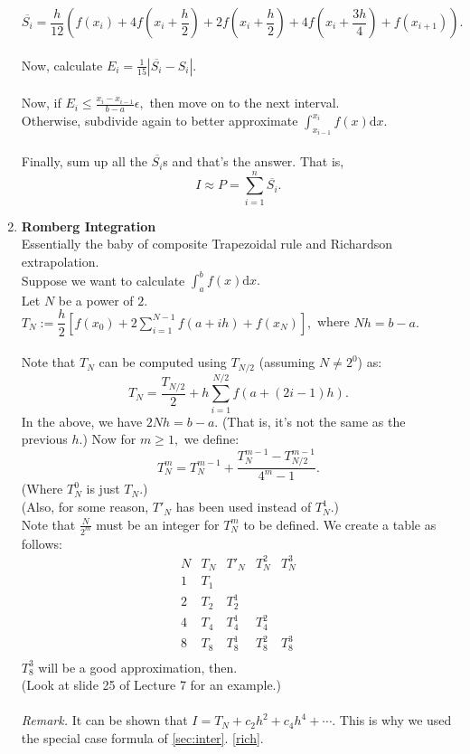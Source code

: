 \documentclass{article}
\begin{document}
\begin{enumerate}
	$\overline{S_i} = \dfrac{h}{12}\left(f(x_i) + 4f\left(x_i + \dfrac{h}{2}\right) + 2f\left(x_i + \dfrac{h}{2}\right) + 4f\left(x_i + \dfrac{3h}{4}\right) + f(x_{i+1})\right).$\\~\\
	Now, calculate $E_i = \frac{1}{15}|\overline{S_i} - S_i|.$\\~\\
	Now, if $E_i \le \frac{x_{i} - x_{i-1}}{b - a}\epsilon,$ then move on to the next interval.\\
	Otherwise, subdivide again to better approximate $\displaystyle\int_{x_{i-1}}^{x_i} f(x) \text{d}x.$\\~\\
	Finally, sum up all the $\overline{S_i}$s and that's the answer. That is,
	\[I \approx P = \sum_{i=1}^{n}\overline{S_i}.\]
	\item \textbf{Romberg Integration}\\
	Essentially the baby of composite Trapezoidal rule and Richardson extrapolation.\\
	Suppose we want to calculate $\displaystyle\int_{a}^{b} f(x) \text{d}x.$\\
	Let $N$ be a power of $2$.\\
	$T_N := \dfrac{h}{2}\left[f(x_0) + 2\displaystyle\sum_{i=1}^{N-1}f(a + ih) + f(x_N)\right],$ where $Nh = b-a.$\\~\\
	Note that $T_N$ can be computed using $T_{N/2}$ (assuming $N \neq 2^0$) as:
	\[T_N = \frac{T_{N/2}}{2} + h\sum_{i=1}^{N/2}f\left(a + (2i - 1)h\right).\]
	In the above, we have $2Nh = b - a.$ (That is, it's not the same as the previous $h.$)
	Now for $m \ge 1,$ we define:
	\[T^{m}_N = T^{m-1}_N + \frac{T^{m-1}_N - T^{m-1}_{N/2}}{4^m - 1}.\]
	(Where $T^{0}_N$ is just $T_N.$)\\
	(Also, for some reason, $T'_N$ has been used instead of $T^1_N$.)\\
	Note that $\frac{N}{2^m}$ must be an integer for $T^m_N$ to be defined.
	We create a table as follows:\\
		\[
		\begin{array}{c|c|c|c|c}
			N & T_N & T'_N & T^2_N & T^3_N\\
			\hline
			1 & T_1 & & &\\
			2 & T_2 & T^1_2 & & \\
			4 & T_4 & T^1_4 & T^2_4 & \\
			8 & T_8 & T^1_8 & T^2_8 & T^3_8 \\
		\end{array}
		\]
	$T^3_8$ will be a good approximation, then.\\
	(Look at slide 25 of Lecture 7 for an example.)\\~\\
	\emph{Remark.} It can be shown that $I = T_N + c_2h^2 + c_4h^4 + \cdots.$ This is why we used the special case formula of \ref{sec:inter}. \ref{rich}.
\end{enumerate}
\end{document}
